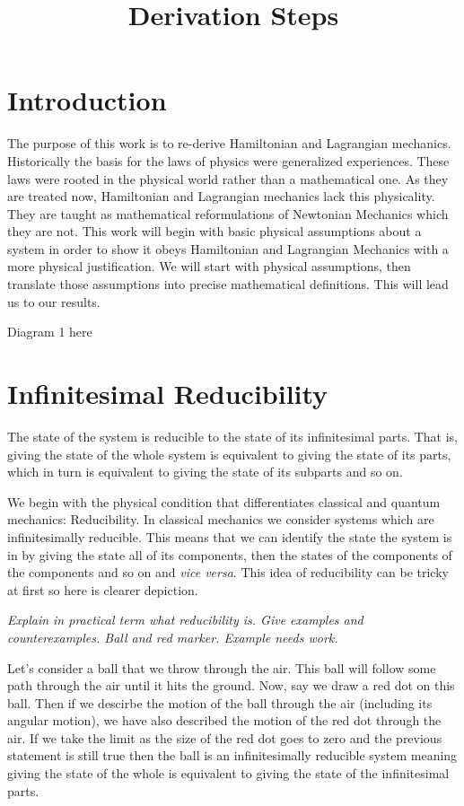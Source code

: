 \documentclass{article}
\begin{document}
\title{Derivation Steps}

\section{Introduction}

	The purpose of this work is to re-derive Hamiltonian and Lagrangian mechanics. Historically the basis for the laws of physics were generalized experiences. These laws were rooted in the physical world rather than a mathematical one. As they are treated now, Hamiltonian and Lagrangian mechanics lack this physicality. They are taught as mathematical reformulations of Newtonian Mechanics which they are not. This work will begin with basic physical assumptions about a system in order to show it obeys Hamiltonian and Lagrangian Mechanics with a more physical justification. We will start with physical assumptions, then translate those assumptions into precise mathematical definitions. This will lead us to our results. 
	
Diagram 1 here

\section{Infinitesimal Reducibility}
	
\begin{assump}
	The state of the system is reducible to the state of its infinitesimal parts. That is, giving the state of the whole system is equivalent to giving the state of its parts, which in turn is equivalent to giving the state of its subparts and so on.
\end{assump}

	We begin with the physical condition that differentiates classical and quantum mechanics: Reducibility. In classical mechanics we consider systems which are infinitesimally reducible. This means that we can identify the state the system is in by giving the state all of its components, then the states of the components of the components and so on and \textit{vice versa}. This idea of reducibility can be tricky at first so here is clearer depiction.
	
	\emph{Explain in practical term what reducibility is. Give examples and counterexamples. Ball and red marker. Example needs work.}
	
	Let's consider a ball that we throw through the air. This ball will follow some path through the air until it hits the ground. Now, say we draw a red dot on this ball. Then if we descirbe the motion of the ball through the air (including its angular motion), we have also described the motion of the red dot through the air. If we take the limit as the size of the red dot goes to zero and the previous statement is still true then the ball is an infinitesimally reducible system meaning giving the state of the whole is equivalent to giving the state of the infinitesimal parts.
	
\end{document}
